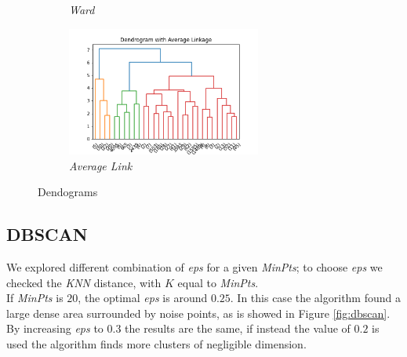 \begin{figure}[h!]
\begin{subfigure}{0.49\textwidth}
        \caption{\emph{Ward}}
        \label{fig:ward_img}
    \end{subfigure}
    \begin{subfigure}{0.49\textwidth}
         \centering
         \includegraphics[width=0.7\textwidth]{img/clustering/avg_link.png}
         \caption{\emph{Average Link}}
         \label{fig:centr_img}
     \end{subfigure}
     \caption{Dendograms}
    \label{fig:dendograms}
\end{figure}

\newpage

\subsection{DBSCAN}

We explored different combination of \emph{eps} for a given \emph{MinPts}; to choose \emph{eps} we checked the \emph{KNN} distance, with $K$ equal to \emph{MinPts}.\\
If \emph{MinPts} is $20$, the optimal \emph{eps} is around $0.25$. In this case the algorithm found a large dense area surrounded by noise points, as is showed in Figure \ref{fig:dbscan}. By increasing \emph{eps} to $0.3$ the results are the same, if instead the value of $0.2$ is used the algorithm finds more clusters of negligible dimension.\\


